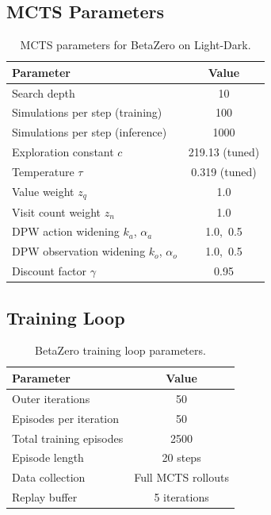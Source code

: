 \documentclass[acmlarge, manuscript, screen, review, natbib=false, oneside]{acmart}
\begin{document}
\subsection{MCTS Parameters}

\begin{table}[ht]
    \centering
    \small
    \setlength{\tabcolsep}{4pt}
    \begin{tabular}{|l|c|}
        \hline
        \textbf{Parameter} & \textbf{Value} \\
        \hline
        Search depth & 10 \\
        \hline
        Simulations per step (training) & 100 \\
        \hline
        Simulations per step (inference) & 1000 \\
        \hline
        Exploration constant $c$ & 219.13 (tuned) \\
        \hline
        Temperature $\tau$ & 0.319 (tuned) \\
        \hline
        Value weight $z_q$ & 1.0 \\
        \hline
        Visit count weight $z_n$ & 1.0 \\
        \hline
        DPW action widening $k_a$, $\alpha_a$ & 1.0,\ 0.5 \\
        \hline
        DPW observation widening $k_o$, $\alpha_o$ & 1.0,\ 0.5 \\
        \hline
        Discount factor $\gamma$ & 0.95 \\
        \hline
    \end{tabular}
    \caption{MCTS parameters for BetaZero on Light-Dark.}
    \label{tab:bz_mcts}
\end{table}

\subsection{Training Loop}

\begin{table}[ht]
    \centering
    \small
    \setlength{\tabcolsep}{4pt}
    \begin{tabular}{|l|c|}
        \hline
        \textbf{Parameter} & \textbf{Value} \\
        \hline
        Outer iterations & 50 \\
        \hline
        Episodes per iteration & 50 \\
        \hline
        Total training episodes & 2500 \\
        \hline
        Episode length & 20 steps \\
        \hline
        Data collection & Full MCTS rollouts \\
        \hline
        Replay buffer & 5 iterations \\
        \hline
    \end{tabular}
    \caption{BetaZero training loop parameters.}
    \label{tab:bz_training}
\end{table}
\end{document}
